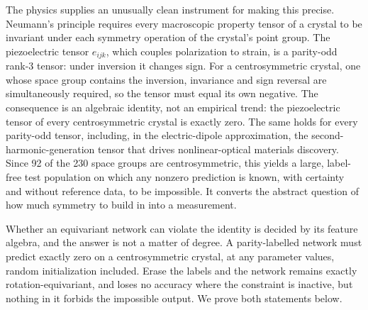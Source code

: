 The physics supplies an unusually clean instrument for making this precise. Neumann's principle\cite{nye1985crystals} requires every macroscopic property tensor of a crystal to be invariant under each symmetry operation of the crystal's point group. The piezoelectric tensor $e_{ijk}$, which couples polarization to strain, is a parity-odd rank-3 tensor: under inversion it changes sign. For a centrosymmetric crystal, one whose space group contains the inversion, invariance and sign reversal are simultaneously required, so the tensor must equal its own negative. The consequence is an algebraic identity, not an empirical trend: the piezoelectric tensor of every centrosymmetric crystal is exactly zero. The same holds for every parity-odd tensor, including, in the electric-dipole approximation, the second-harmonic-generation tensor that drives nonlinear-optical materials discovery\cite{optixnet2026}. Since 92 of the 230 space groups are centrosymmetric, this yields a large, label-free test population on which any nonzero prediction is known, with certainty and without reference data, to be impossible. It converts the abstract question of how much symmetry to build in into a measurement.

Whether an equivariant network can violate the identity is decided by its feature algebra, and the answer is not a matter of degree. A parity-labelled network must predict exactly zero on a centrosymmetric crystal, at any parameter values, random initialization included. Erase the labels and the network remains exactly rotation-equivariant, and loses no accuracy where the constraint is inactive, but nothing in it forbids the impossible output. We prove both statements below.

